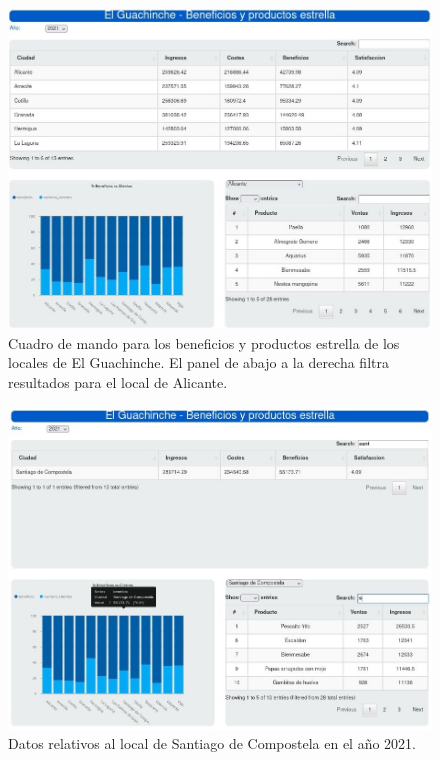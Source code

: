 \documentclass[11pt]{opticajnl}
\begin{document}
\begin{figure}[H]
    \centering
    \includegraphics[height=0.44\textheight]{fotos/cuadro/cuadro_blanco.jpg}
    \caption{Cuadro de mando para los beneficios y productos estrella de los locales de El Guachinche. El panel de abajo a la derecha filtra resultados para el local de Alicante.}
    \label{fig:cuadro-blanco}
\end{figure}


\begin{figure}[H]
    \centering
    \includegraphics[height=0.44\textheight]{fotos/cuadro/2021-santiago.jpg}
    \caption{Datos relativos al local de Santiago de Compostela en el año 2021.}
    \label{fig:cuadro-santiago}
\end{figure}
\end{document}
